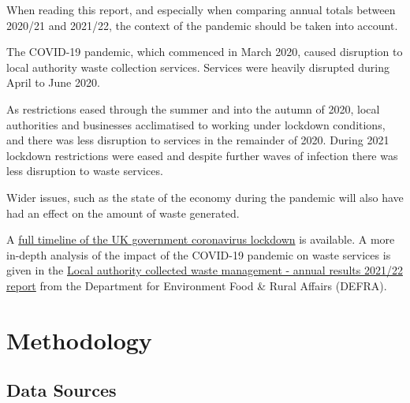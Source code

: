 \documentclass[
]{article}
\begin{document}
When reading this report, and especially when comparing annual totals
between 2020/21 and 2021/22, the context of the pandemic should be taken
into account.

The COVID-19 pandemic, which commenced in March 2020, caused disruption
to local authority waste collection services. Services were heavily
disrupted during April to June 2020.

As restrictions eased through the summer and into the autumn of 2020,
local authorities and businesses acclimatised to working under lockdown
conditions, and there was less disruption to services in the remainder
of 2020. During 2021 lockdown restrictions were eased and despite
further waves of infection there was less disruption to waste services.

Wider issues, such as the state of the economy during the pandemic will
also have had an effect on the amount of waste generated.

A
\href{https://www.instituteforgovernment.org.uk/sites/default/files/2022-12/timeline-coronavirus-lockdown-december-2021.pdf}{full
timeline of the UK government coronavirus lockdown} is available. A more
in-depth analysis of the impact of the COVID-19 pandemic on waste
services is given in the
\href{https://www.gov.uk/government/statistics/local-authority-collected-waste-management-annual-results-202122/local-authority-collected-waste-management-annual-results-202122\#coronavirus-covid-19-the-impact-of-the-pandemic-on-local-authority-waste-collection-and-services}{Local
authority collected waste management - annual results 2021/22 report}
from the Department for Environment Food \& Rural Affairs (DEFRA).

\newpage

\hypertarget{methodology}{%
\section{Methodology}\label{methodology}}

\hypertarget{data-sources}{%
\subsection{Data Sources}\label{data-sources}}
\end{document}
